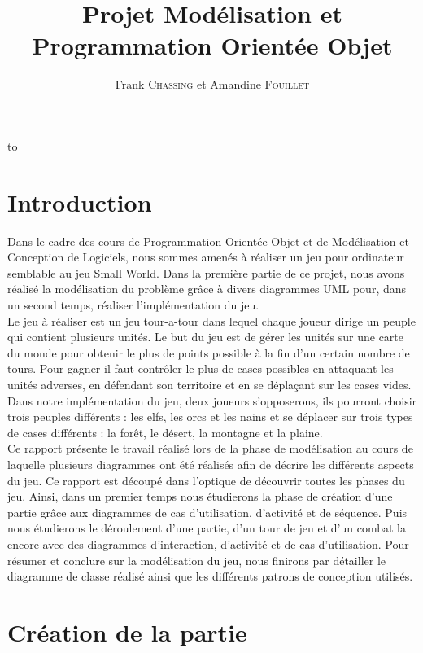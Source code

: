 \documentclass[a4paper,11pt]{article}
\author{}
\title{}
\title{\LARGE{Projet Modélisation et Programmation Orientée Objet}}
\author{Frank \textsc{Chassing} et Amandine \textsc{Fouillet}}
\makeatletter
\def\clap#1{\hbox to 0pt{\hss #1\hss}}%
\def\haut#1#2#3{%
\hbox to \hsize{%
\rlap{\vtop{\raggedright #1}}%
\hss
\clap{\vtop{\centering #2}}%
\hss
\llap{\vtop{\raggedleft #3}}}}%
\def\bas#1#2#3{%
\hbox to \hsize{%
\rlap{\vbox{\raggedright #1}}%
\hss
\clap{\vbox{\centering #2}}%
\hss
\llap{\vbox{\raggedleft #3}}}}%
\def\maketitle{%
\thispagestyle{empty}\vbox to \vsize{%
\haut{}{\@blurb}{}
\vfill
\vspace{1cm}
\begin{flushleft}
\usefont{OT1}{ptm}{m}{n}
\huge \@title
\end{flushleft}
\par
\hrule height 4pt
\par
\begin{flushright}
\usefont{OT1}{phv}{m}{n}
\Large \@author
\par
\end{flushright}
\vspace{1cm}
\vfill
\vfill
\bas{}{\@location, le \@date}{}
}%
\cleardoublepage
}
\makeatother
\begin{document}
\maketitle
\tableofcontents
\newpage
\section*{Introduction}
Dans le cadre des cours de Programmation Orientée Objet et de Modélisation et Conception de Logiciels, nous sommes amenés à réaliser un jeu pour ordinateur semblable au jeu Small World. Dans la première partie de ce projet, nous avons réalisé la modélisation du problème grâce à divers diagrammes UML pour, dans un second temps, réaliser l'implémentation du jeu. \\

Le jeu à réaliser est un jeu tour-a-tour dans lequel chaque joueur dirige un peuple qui contient plusieurs unités. Le but du jeu est de gérer les unités sur une carte du monde pour obtenir le plus de points possible à la fin d'un certain nombre de tours. Pour gagner il faut contrôler le plus de cases possibles en attaquant les unités adverses, en défendant son territoire et en se déplaçant sur les cases vides. Dans notre implémentation du jeu, deux joueurs s'opposerons, ils pourront choisir trois peuples différents : les elfs, les orcs et les nains et se déplacer sur trois types de cases différents : la forêt, le désert, la montagne et la plaine.\\

Ce rapport présente le travail réalisé lors de la phase de modélisation au cours de laquelle plusieurs diagrammes ont été réalisés afin de décrire les différents aspects du jeu. Ce rapport est découpé dans l'optique de découvrir toutes les phases du jeu. Ainsi, dans un premier temps nous étudierons la phase de création d'une partie grâce aux diagrammes de cas d'utilisation, d'activité et de séquence. Puis nous étudierons le déroulement d'une partie, d'un tour de jeu et d'un combat la encore avec des diagrammes d'interaction, d'activité et de cas d'utilisation. Pour résumer et conclure sur la modélisation du jeu, nous finirons par détailler le diagramme de classe réalisé ainsi que les différents patrons de conception utilisés.
\newpage
\section{Création de la partie}
\lipsum[1]
\end{document}
